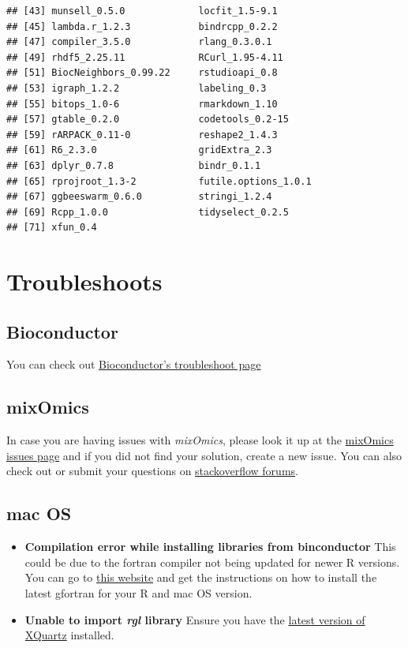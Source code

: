 \documentclass[]{book}
\theoremstyle{definition}
\theoremstyle{definition}
\theoremstyle{definition}
\theoremstyle{remark}
\begin{document}
\begin{verbatim}
## [43] munsell_0.5.0             locfit_1.5-9.1           
## [45] lambda.r_1.2.3            bindrcpp_0.2.2           
## [47] compiler_3.5.0            rlang_0.3.0.1            
## [49] rhdf5_2.25.11             RCurl_1.95-4.11          
## [51] BiocNeighbors_0.99.22     rstudioapi_0.8           
## [53] igraph_1.2.2              labeling_0.3             
## [55] bitops_1.0-6              rmarkdown_1.10           
## [57] gtable_0.2.0              codetools_0.2-15         
## [59] rARPACK_0.11-0            reshape2_1.4.3           
## [61] R6_2.3.0                  gridExtra_2.3            
## [63] dplyr_0.7.8               bindr_0.1.1              
## [65] rprojroot_1.3-2           futile.options_1.0.1     
## [67] ggbeeswarm_0.6.0          stringi_1.2.4            
## [69] Rcpp_1.0.0                tidyselect_0.2.5         
## [71] xfun_0.4
\end{verbatim}

\hypertarget{troubleshoots}{%
\section{Troubleshoots}\label{troubleshoots}}

\hypertarget{bioconductor}{%
\subsection{Bioconductor}\label{bioconductor}}

You can check out
\href{https://bioconductor.org/install/\#troubleshoot-bioconductor-packages}{Bioconductor's
troubleshoot page}

\hypertarget{mixomics}{%
\subsection{mixOmics}\label{mixomics}}

In case you are having issues with \emph{mixOmics}, please look it up at
the \href{https://bitbucket.org/klecao/package-mixomics/issues}{mixOmics
issues page} and if you did not find your solution, create a new issue.
You can also check out or submit your questions on
\href{https://stackoverflow.com/search?q=mixomics}{stackoverflow
forums}.

\hypertarget{mac-os}{%
\subsection{mac OS}\label{mac-os}}

\begin{itemize}
\item
  \textbf{Compilation error while installing libraries from
  binconductor} This could be due to the fortran compiler not being
  updated for newer R versions. You can go to
  \href{https://thecoatlessprofessor.com/programming/rcpp-rcpparmadillo-and-os-x-mavericks--lgfortran-and--lquadmath-error/}{this
  website} and get the instructions on how to install the latest
  gfortran for your R and mac OS version.
\item
  \textbf{Unable to import \emph{rgl} library } Ensure you have the
  \href{https://www.xquartz.org/}{latest version of XQuartz} installed.
\end{itemize}
\end{document}
